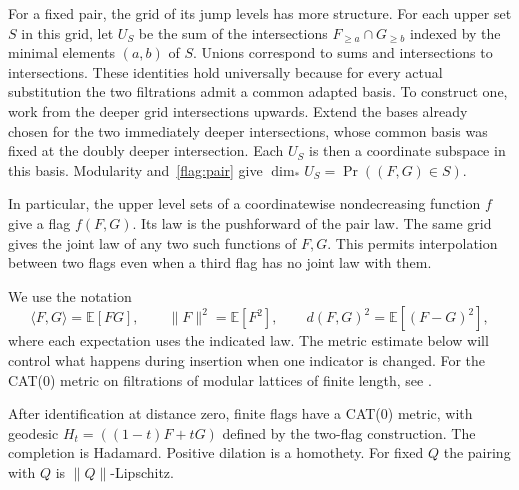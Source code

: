 For a fixed pair, the grid of its jump levels has more structure.
For each upper set $S$ in this grid, let $U_S$ be the sum of the
intersections $F_{\ge a}\cap G_{\ge b}$ indexed by the minimal
elements $(a,b)$ of $S$. Unions correspond to sums and intersections
to intersections. These identities hold universally because for every
actual substitution the two filtrations admit a common adapted basis.
To construct one, work from the deeper grid intersections upwards.
Extend the bases already chosen for the two immediately deeper
intersections, whose common basis was fixed at the doubly deeper
intersection. Each $U_S$ is then a coordinate subspace in this basis.
Modularity and~\eqref{flag:pair} give
$\dim_*U_S=\Pr((F,G)\in S)$.

In particular, the upper level sets of a coordinatewise nondecreasing
function $f$ give a flag $f(F,G)$. Its law is the pushforward of the
pair law. The same grid gives the joint law of any two such functions
of $F,G$. This permits interpolation between two flags even when a
third flag has no joint law with them.

We use the notation
\[
 \langle F,G\rangle=\mathbb E[FG],\qquad
 \|F\|^2=\mathbb E[F^2],\qquad d(F,G)^2=\mathbb E[(F-G)^2],
\]
where each expectation uses the indicated law. The metric estimate
below will control what happens during insertion when one indicator is
changed. For the CAT(0) metric on filtrations of modular lattices of
finite length, see \cite[Proposition~2.6]{Cornut}.

\begin{proposition}\label{flag:metric}
After identification at distance zero, finite flags have a CAT(0)
metric, with geodesic $H_t=((1-t)F+tG)$ defined by the two-flag
construction. The completion is Hadamard. Positive dilation is a
homothety. For fixed $Q$ the pairing with $Q$ is $\|Q\|$-Lipschitz.
\end{proposition}

